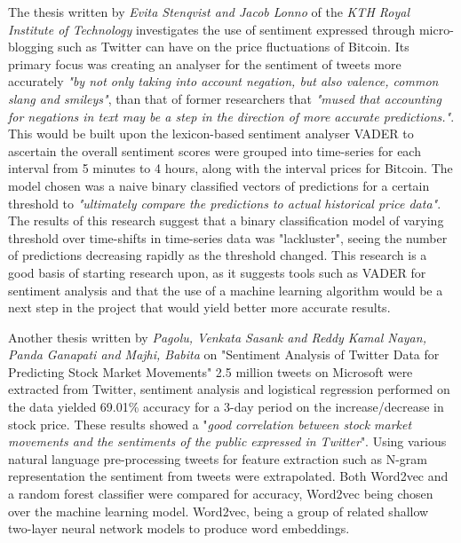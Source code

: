 \documentclass[oneside, 10pt]{article}
\begin{document}
		The thesis written by \textit{Evita Stenqvist and Jacob Lonno} of the \textit{KTH Royal Institute of Technology} \cite{3} investigates the use of sentiment expressed through micro-blogging such as Twitter can have on the price fluctuations of Bitcoin. Its primary focus was creating an analyser for the sentiment of tweets more accurately \textit{"by not only taking into account negation, but also valence, common slang and smileys"}, than that of former researchers that \textit{"mused that accounting for negations in text may be a step in the direction of more accurate predictions."}. This would be built upon the lexicon-based sentiment analyser VADER to ascertain the overall sentiment scores were grouped into time-series for each interval from 5 minutes to 4 hours, along with the interval prices for Bitcoin. The model chosen was a naive binary classified vectors of predictions for a certain threshold to \textit{"ultimately compare the predictions to actual historical price data"}. The results of this research suggest that a binary classification model of varying threshold over time-shifts in time-series data was "lackluster", seeing the number of predictions decreasing rapidly as the threshold changed. This research is a good basis of starting research upon, as it suggests tools such as VADER for sentiment analysis and that the use of a machine learning algorithm would be a next step in the project that would yield better more accurate results.
		
		Another thesis written by \textit{Pagolu, Venkata Sasank and Reddy Kamal Nayan, Panda Ganapati and Majhi, Babita} \cite{1} on "Sentiment Analysis of Twitter Data for Predicting Stock Market Movements" 2.5 million tweets on Microsoft were extracted from Twitter, sentiment analysis and logistical regression performed on the data yielded 69.01\% accuracy for a 3-day period on the increase/decrease in stock price. These results showed a "\textit{good correlation between stock market movements and the sentiments of the public expressed in Twitter}". Using various natural language pre-processing tweets for feature extraction such as N-gram representation the sentiment from tweets were extrapolated. Both Word2vec and a random forest classifier were compared for accuracy, Word2vec being chosen over the machine learning model. Word2vec, being a group of related shallow two-layer neural network models to produce word embeddings.
		
\end{document}
